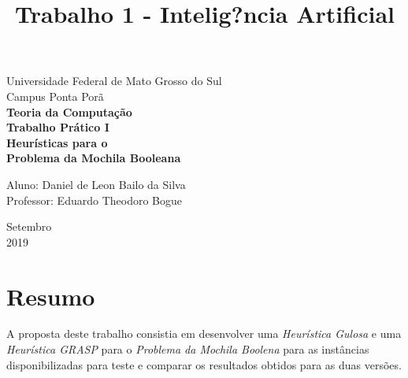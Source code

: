 \documentclass[a4paper, 12pt]{article}
\title{Trabalho 1 - Intelig?ncia Artificial}
\begin{document}
\begin{titlepage}
    \begin{center}
		\LARGE{Universidade Federal de Mato Grosso do Sul}\\
		\vspace{5pt}
        \large{Campus Ponta Porã}\\ 
        \large{{\textbf{Teoria da Computação}}}\\ 
        \vspace{15pt}
        \vspace{95pt}
        \textbf{\large{Trabalho Prático I}}\\
        \vspace{15pt}
        \textbf{\LARGE{Heurísticas para o \\Problema da Mochila Booleana}}\\
        \vspace{5cm}
    \end{center}
    
    \begin{flushleft}
        \begin{tabbing}
            Aluno: Daniel de Leon Bailo da Silva\\            
            Professor: Eduardo Theodoro Bogue\\
    \end{tabbing}
 \end{flushleft}
    \vspace{1cm}
    
    \begin{center}
        \vspace{\fill}
            Setembro\\
         2019
            \end{center}
\end{titlepage}

\clearpage
\tableofcontents
\thispagestyle{empty}
\clearpage


\section*{Resumo}
A proposta deste trabalho consistia em desenvolver uma \textit{Heurística Gulosa} e uma \textit{Heurística GRASP}
para o \textit{Problema da Mochila Boolena} para as instâncias disponibilizadas para teste e 
comparar os resultados obtidos para as duas versões.
\end{document}
